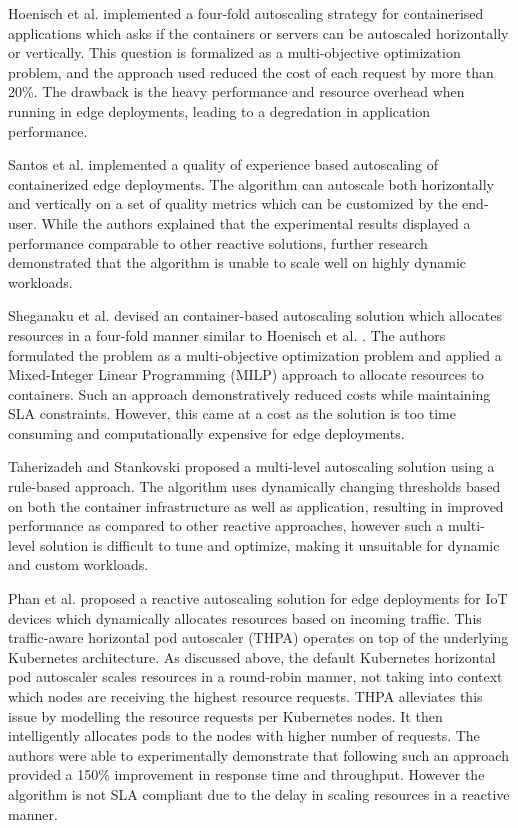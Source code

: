 Hoenisch et al. \cite{hoenisch2015four} implemented a four-fold autoscaling strategy for containerised applications which asks if the containers or servers can be autoscaled horizontally or vertically. This question is formalized as a multi-objective optimization problem, and the approach used reduced the cost of each request by more than 20\%. The drawback is the heavy performance and resource overhead when running in edge deployments, leading to a degredation in application performance.\par

Santos et al. \cite{santos2020qoe} implemented a quality of experience based autoscaling of containerized edge deployments. The algorithm can autoscale both horizontally and vertically on a set of quality metrics which can be customized by the end-user. While the authors explained that the experimental results displayed a performance comparable to other reactive solutions, further research demonstrated that the algorithm is unable to scale well on highly dynamic workloads.\par

Sheganaku et al. \cite{sheganaku2023cost} devised an container-based autoscaling solution which allocates resources in a four-fold manner similar to Hoenisch et al. \cite{hoenisch2015four}. The authors formulated the problem as a multi-objective optimization problem and applied a Mixed-Integer Linear Programming (MILP) approach to allocate resources to containers. Such an approach demonstratively reduced costs while maintaining SLA constraints. However, this came at a cost as the solution is too time consuming and computationally expensive for edge deployments.\par

Taherizadeh and Stankovski \cite{taherizadeh2019dynamic} proposed a multi-level autoscaling solution using a rule-based approach. The algorithm uses dynamically changing thresholds based on both the container infrastructure as well as application, resulting in improved performance as compared to other reactive approaches, however such a multi-level solution is difficult to tune and optimize, making it unsuitable for dynamic and custom workloads.\par

Phan et al. \cite{phan2022traffic} proposed a reactive autoscaling solution for edge deployments for IoT devices which dynamically allocates resources based on incoming traffic. This traffic-aware horizontal pod autoscaler (THPA) operates on top of the underlying Kubernetes architecture. As discussed above, the default Kubernetes horizontal pod autoscaler scales resources in a round-robin manner, not taking into context which nodes are receiving the highest resource requests. THPA alleviates this issue by modelling the resource requests per Kubernetes nodes. It then intelligently allocates pods to the nodes with higher number of requests. The authors were able to experimentally demonstrate that following such an approach provided a 150\% improvement in response time and throughput. However the algorithm is not SLA compliant due to the delay in scaling resources in a reactive manner.

